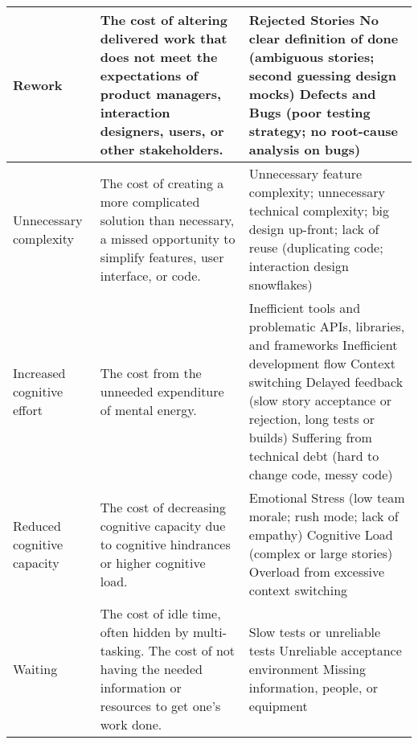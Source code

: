 \begin{table*}[t]
\begin{tabular}{|p{1.7in}|p{1.9in}|p{3in}|}
Rework                                & The cost of altering delivered work that does not meet the expectations of product managers, interaction designers, users, or other stakeholders. & Rejected Stories \newline No clear definition of done (ambiguous stories; second guessing design mocks) \newline Defects and Bugs (poor testing strategy; no root-cause analysis on bugs)                                                                                                                                                                   \\ \hline
Unnecessary complexity  & The cost of creating a more complicated solution than necessary,  a missed opportunity to simplify features, user interface, or code.      & 
Unnecessary feature complexity; unnecessary technical complexity; big design up-front; lack of reuse (duplicating code; interaction design snowflakes)                                                                                                                                                                                                                                                                                                                  \\ \hline
Increased cognitive effort         &   The cost from the unneeded expenditure of mental energy.  & 
Inefficient tools and problematic APIs, libraries, and frameworks \newline
Inefficient development flow \newline
Context switching \newline
Delayed feedback (slow story acceptance or rejection, long tests or builds) \newline
Suffering from technical debt (hard to change code, messy code)
 \\ \hline
Reduced cognitive capacity           & The cost of decreasing cognitive capacity due to cognitive hindrances or higher cognitive load.                         & 
Emotional Stress (low team morale; rush mode; lack of empathy) \newline 
Cognitive Load (complex or large stories) \newline
Overload from excessive context switching
 \\ \hline
Waiting                               & The cost of idle time, often hidden by multi-tasking. The cost of not having the needed information or resources to get one's work done. & 
Slow tests or unreliable tests \newline Unreliable acceptance environment \newline Missing information, people, or equipment                                                                                                                                                                                                                                                                            \\ \hline

\end{tabular}
\end{table*}
